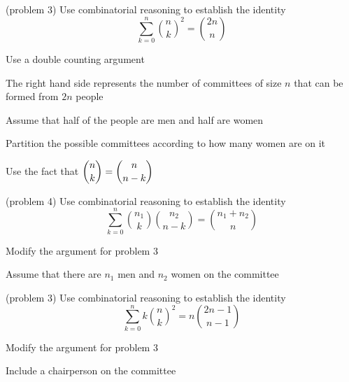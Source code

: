 \documentclass[handout]{ximera}
\begin{document}
\begin{problem}(problem 3)
Use combinatorial reasoning to establish the identity
\[
\sum_{k=0}^n \binom{n}{k}^2 = \binom{2n}{n}
\]
\begin{hint}
Use a double counting argument
\end{hint}
\begin{hint}
The right hand side represents the number of committees of size $n$ that can be formed from $2n$ people
\end{hint}
\begin{hint}
Assume that half of the people are men and half are women
\end{hint}
\begin{hint}
Partition the possible committees according to how many women are on it
\end{hint}
\begin{hint}
Use the fact that $\displaystyle \binom{n}{k} = \binom{n}{n-k}$
\end{hint}
\end{problem}

\begin{problem}(problem 4)
Use combinatorial reasoning to establish the identity
\[
\sum_{k=0}^n \binom{n_1}{k}\binom{n_2}{n-k} = \binom{n_1+n_2}{n}
\]
\begin{hint}
Modify the argument for problem 3
\end{hint}
\begin{hint}
Assume that there are $n_1$ men and $n_2$ women on the committee
\end{hint}
\end{problem}

\begin{problem}(problem 3)
Use combinatorial reasoning to establish the identity
\[
\sum_{k=0}^n k\binom{n}{k}^2 = n\binom{2n-1}{n-1}
\]
\begin{hint}
Modify the argument for problem 3
\end{hint}
\begin{hint}
Include a chairperson on the committee
\end{hint}
\end{problem}
\end{document}

